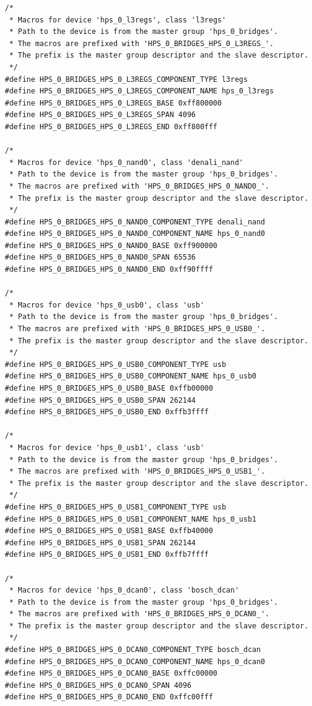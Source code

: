 \documentclass[conference]{IEEEtran}
\begin{document}
\begin{lstlisting}
/*
 * Macros for device 'hps_0_l3regs', class 'l3regs'
 * Path to the device is from the master group 'hps_0_bridges'.
 * The macros are prefixed with 'HPS_0_BRIDGES_HPS_0_L3REGS_'.
 * The prefix is the master group descriptor and the slave descriptor.
 */
#define HPS_0_BRIDGES_HPS_0_L3REGS_COMPONENT_TYPE l3regs
#define HPS_0_BRIDGES_HPS_0_L3REGS_COMPONENT_NAME hps_0_l3regs
#define HPS_0_BRIDGES_HPS_0_L3REGS_BASE 0xff800000
#define HPS_0_BRIDGES_HPS_0_L3REGS_SPAN 4096
#define HPS_0_BRIDGES_HPS_0_L3REGS_END 0xff800fff

/*
 * Macros for device 'hps_0_nand0', class 'denali_nand'
 * Path to the device is from the master group 'hps_0_bridges'.
 * The macros are prefixed with 'HPS_0_BRIDGES_HPS_0_NAND0_'.
 * The prefix is the master group descriptor and the slave descriptor.
 */
#define HPS_0_BRIDGES_HPS_0_NAND0_COMPONENT_TYPE denali_nand
#define HPS_0_BRIDGES_HPS_0_NAND0_COMPONENT_NAME hps_0_nand0
#define HPS_0_BRIDGES_HPS_0_NAND0_BASE 0xff900000
#define HPS_0_BRIDGES_HPS_0_NAND0_SPAN 65536
#define HPS_0_BRIDGES_HPS_0_NAND0_END 0xff90ffff

/*
 * Macros for device 'hps_0_usb0', class 'usb'
 * Path to the device is from the master group 'hps_0_bridges'.
 * The macros are prefixed with 'HPS_0_BRIDGES_HPS_0_USB0_'.
 * The prefix is the master group descriptor and the slave descriptor.
 */
#define HPS_0_BRIDGES_HPS_0_USB0_COMPONENT_TYPE usb
#define HPS_0_BRIDGES_HPS_0_USB0_COMPONENT_NAME hps_0_usb0
#define HPS_0_BRIDGES_HPS_0_USB0_BASE 0xffb00000
#define HPS_0_BRIDGES_HPS_0_USB0_SPAN 262144
#define HPS_0_BRIDGES_HPS_0_USB0_END 0xffb3ffff

/*
 * Macros for device 'hps_0_usb1', class 'usb'
 * Path to the device is from the master group 'hps_0_bridges'.
 * The macros are prefixed with 'HPS_0_BRIDGES_HPS_0_USB1_'.
 * The prefix is the master group descriptor and the slave descriptor.
 */
#define HPS_0_BRIDGES_HPS_0_USB1_COMPONENT_TYPE usb
#define HPS_0_BRIDGES_HPS_0_USB1_COMPONENT_NAME hps_0_usb1
#define HPS_0_BRIDGES_HPS_0_USB1_BASE 0xffb40000
#define HPS_0_BRIDGES_HPS_0_USB1_SPAN 262144
#define HPS_0_BRIDGES_HPS_0_USB1_END 0xffb7ffff

/*
 * Macros for device 'hps_0_dcan0', class 'bosch_dcan'
 * Path to the device is from the master group 'hps_0_bridges'.
 * The macros are prefixed with 'HPS_0_BRIDGES_HPS_0_DCAN0_'.
 * The prefix is the master group descriptor and the slave descriptor.
 */
#define HPS_0_BRIDGES_HPS_0_DCAN0_COMPONENT_TYPE bosch_dcan
#define HPS_0_BRIDGES_HPS_0_DCAN0_COMPONENT_NAME hps_0_dcan0
#define HPS_0_BRIDGES_HPS_0_DCAN0_BASE 0xffc00000
#define HPS_0_BRIDGES_HPS_0_DCAN0_SPAN 4096
#define HPS_0_BRIDGES_HPS_0_DCAN0_END 0xffc00fff


\end{lstlisting}
\end{document}
